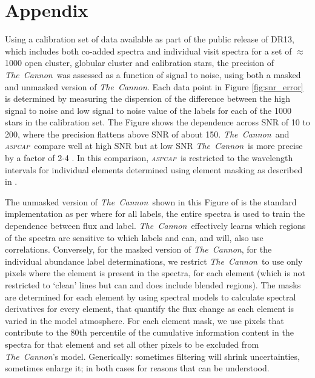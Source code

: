 \documentclass[14pt, preprint2]{aastex6}
\newcommand{\project}[1]{\textsl{#1}}
\newcommand{\tc}{\project{The~Cannon}}
\newcommand{\aspcap}{\project{\textsc{aspcap}}}
\begin{document}


\pagebreak

\section{Appendix}

Using a calibration set of data available as part of the public release of DR13, which includes both co-added spectra and individual visit spectra for a set of $\approx$ 1000 open cluster, globular cluster and calibration stars, the precision of \tc\ was assessed as a function of signal to noise, using both a masked and unmasked version of \tc. Each data point in Figure \ref{fig:snr_error} is determined by measuring the dispersion of the difference between the high signal to noise and low signal to noise value of the labels for each of the 1000 stars in the calibration set. The Figure shows the dependence across SNR of 10 to 200, where the precision flattens above SNR of about 150. \tc\ and \aspcap\ compare well at high SNR but at low SNR \tc\ is more precise by a factor of 2-4 \citep[also see][]{Ness2015}. In this comparison, \aspcap\ is restricted to the wavelength intervals for individual elements determined using element masking as described in \citet{GP2016}. 

The unmasked version of \tc\ shown in this Figure of is the standard implementation as per \citet{Ness2015} where for all labels, the entire spectra is used to train the dependence between flux and label. \tc\ effectively learns which regions of the spectra are sensitive to which labels \citep[e.g.][]{Ness2016, Ho2016b} and can, and will, also use correlations. Conversely, for the masked version of \tc, for the individual abundance label determinations, we restrict \tc\ to use only pixels where the element is present in the spectra, for each element (which is not restricted to `clean' lines but can and does include blended regions). The masks are determined for each element by using spectral models to calculate spectral derivatives for every element, that quantify the flux change as each element is varied in the model atmosphere. For each element mask, we use pixels that contribute to the 80th percentile of the cumulative information content in the spectra for that element and set all other pixels to be excluded from \tc's model. Generically: sometimes filtering will shrink uncertainties, sometimes enlarge it; in both cases for reasons that can be understood. 
\end{document}
